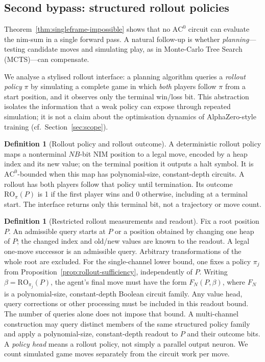 \documentclass[11pt]{article}
\newcommand{\AC}{\mathrm{AC}}
\theoremstyle{plain}
\theoremstyle{definition}
\newtheorem{definition}[theorem]{Definition}
\theoremstyle{remark}
\numberwithin{equation}{section}
\begin{document}
\subsection{Second bypass: structured rollout policies}
\label{sec:search-gap}

Theorem~\ref{thm:singleframe-impossible} shows that no $\AC^0$ circuit can evaluate the nim-sum in a single forward pass.
A natural follow-up is whether \emph{planning}---testing candidate moves and simulating play, as in Monte-Carlo Tree Search (MCTS)---can compensate.

We analyse a stylised rollout interface: a planning algorithm queries a \emph{rollout policy} $\pi$ by simulating a complete game in which \emph{both} players follow $\pi$ from a start position, and it observes only the terminal win/loss bit.
This abstraction isolates the information that a weak policy can expose through repeated simulation; it is not a claim about the optimisation dynamics of AlphaZero-style training (cf.\ Section~\ref{sec:scope}).

\begin{definition}[Rollout policy and rollout outcome]
\label{def:rollout-policy}
A deterministic rollout policy maps a nonterminal $NB$-bit NIM position to a legal move, encoded by a heap index and its new value; on the terminal position it outputs a halt symbol. It is $\AC^0$-bounded when this map has polynomial-size, constant-depth circuits.
A rollout has both players follow that policy until termination. Its outcome $\mathrm{RO}_{\pi}(P)$ is 1 if the first player wins and 0 otherwise, including at a terminal start. The interface returns only this terminal bit, not a trajectory or move count.
\end{definition}

\begin{definition}[Restricted rollout measurements and readout]
\label{def:agent-types}
Fix a root position $P$. An admissible query starts at $P$ or a position obtained by changing one heap of $P$; the changed index and old/new values are known to the readout. A legal one-move successor is an admissible query. Arbitrary transformations of the whole root are excluded.
For the single-channel lower bound, one fixes a policy $\pi_j$ from Proposition~\ref{prop:rollout-sufficiency}, independently of $P$. Writing $\beta=\mathrm{RO}_{\pi_j}(P)$, the agent's final move must have the form $F_N(P,\beta)$, where $F_N$ is a polynomial-size, constant-depth Boolean circuit family. Any value head, query corrections or other processing must be included in this readout bound. The number of queries alone does not impose that bound.
A multi-channel construction may query distinct members of the same structured policy family and apply a polynomial-size, constant-depth readout to $P$ and their outcome bits. A \emph{policy head} means a rollout policy, not simply a parallel output neuron. We count simulated game moves separately from the circuit work per move.
\end{definition}
\end{document}
